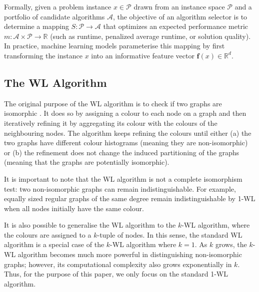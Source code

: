 Formally, given a problem instance $x \in \mathcal{P}$ drawn from an instance space $\mathcal{P}$ and a portfolio of candidate algorithms $\mathcal{A}$, the objective of an algorithm selector is to determine a mapping $S: \mathcal{P} \to \mathcal{A}$ that optimizes an expected performance metric $m: \mathcal{A} \times \mathcal{P} \to \mathbb{R}$ (such as runtime, penalized average runtime, or solution quality). In practice, machine learning models parameterise this mapping by first transforming the instance $x$ into an informative feature vector $\mathbf{f}(x) \in \mathbb{R}^d$.

\subsection{The WL Algorithm}\label{sec:wl}
The original purpose of the WL algorithm is to check if two graphs are isomorphic \citep{kiefer2020power}. It does so by assigning a colour to each node on a graph and then iteratively refining it by aggregating its colour with the colours of the neighbouring nodes. The algorithm keeps refining the colours until either (a) the two graphs have different colour histograms (meaning they are non-isomorphic) or (b) the refinement does not change the induced partitioning of the graphs (meaning that the graphs are potentially isomorphic).

It is important to note that the WL algorithm is not a complete isomorphism test: two non-isomorphic graphs can remain indistinguishable. For example, equally sized regular graphs of the same degree remain indistinguishable by 1-WL when all nodes initially have the same colour.

It is also possible to generalise the WL algorithm to the $k$-WL algorithm, where the colours are assigned to a $k$-tuple of nodes. In this sense, the standard WL algorithm is a special case of the $k$-WL algorithm where $k=1$. As $k$ grows, the $k$-WL algorithm becomes much more powerful in distinguishing non-isomorphic graphs; however, its computational complexity also grows exponentially in $k$. Thus, for the purpose of this paper, we only focus on the standard 1-WL algorithm.
